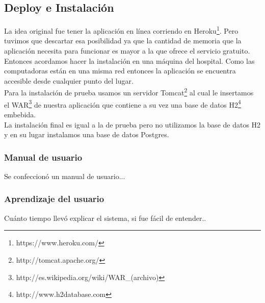 \subsection{Deploy e Instalación}
La idea original fue tener la aplicación en línea corriendo en Heroku\footnote{https://www.heroku.com/}. Pero tuvimos que descartar esa posibilidad ya que la cantidad de memoria que la aplicación necesita para funcionar es mayor a la que ofrece el servicio gratuito. Entonces acordamos hacer la instalación en una máquina del hospital. Como las computadoras están en una misma red entonces la aplicación se encuentra accesible desde cualquier punto del lugar.\\
Para la instalación de prueba usamos un servidor Tomcat\footnote{http://tomcat.apache.org/} al cual le insertamos el WAR\footnote{http://es.wikipedia.org/wiki/WAR\_(archivo)} de nuestra aplicación que contiene a su vez una base de datos H2\footnote{http://www.h2database.com} embebida.\\
La instalación final es igual a la de prueba pero no utilizamos la base de datos H2 y en su lugar instalamos una base de datos Postgres.
\subsubsection{Manual de usuario}
Se confeccionó un manual de usuario...
\subsubsection{Aprendizaje del usuario}
Cuánto tiempo llevó explicar el sistema, si fue fácil de entender..